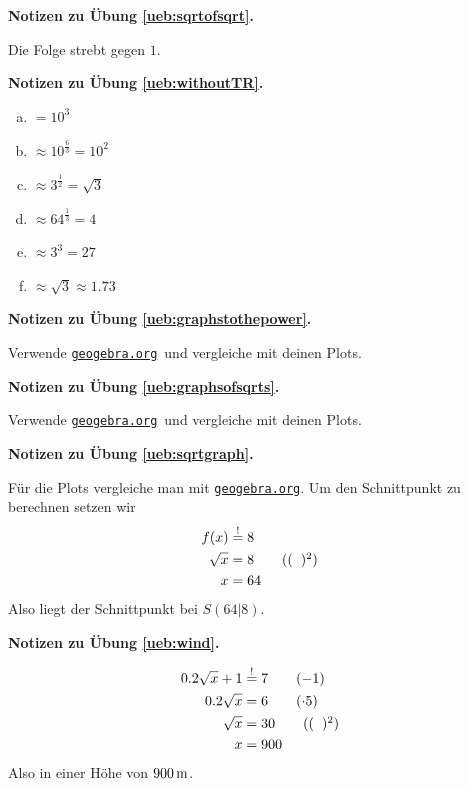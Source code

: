 \documentclass[%
11pt,%
twoside,%
titlepage,%
german,%
headsepline%
]{scrartcl}
\newcommand{\geogebralink}{\href{https://www.geogebra.org/calculator}{\texttt{geogebra.org}}}
\newcommand{\concatueb}[1]{ueb:#1}%
\newcommand{\concatlsg}[1]{lsg:#1}%
\newenvironment{lsg}[1]{%
    \par\noindent\textbf{Notizen zu Übung \ref{\concatueb{#1}}.}%
    \label{\concatlsg{#1}}
}{%
    \par%
}
\begin{document}

\begin{lsg}{sqrtofsqrt}
  Die Folge strebt gegen $1$.
\end{lsg}

\begin{lsg}{withoutTR}
  \begin{enumerate}[a)]
    \item $=10^3$
    \item $\approx10^\frac{6}{3}=10^2$
    \item $\approx3^\frac{1}{2}=\sqrt{3}$
    \item $\approx64^\frac{1}{3}=4$
    \item $\approx3^3=27$
    \item $\approx\sqrt{3}\approx1.73$
  \end{enumerate}
\end{lsg}

\begin{lsg}{graphstothepower}
  Verwende \geogebralink\   und vergleiche mit deinen Plots.
\end{lsg}

\begin{lsg}{graphsofsqrts}
  Verwende \geogebralink\   und vergleiche mit deinen Plots.
\end{lsg}

\begin{lsg}{sqrtgraph}
  Für die Plots vergleiche man mit \geogebralink . Um den Schnittpunkt zu berechnen setzen wir
  \begin{align*}
    f(x) &\stackrel{!}{=} 8\\
    \sqrt{x} &= 8\tag{$(\phantom{x})^2$}\\
    x &= 64
  \end{align*}
  Also liegt der Schnittpunkt bei $S(64|8)$.
\end{lsg}

\begin{lsg}{wind}
  \begin{align*}
    0.2\sqrt{x}+1 &\stackrel{!}{=} 7\tag{$-1$}\\
    0.2\sqrt{x} &= 6\tag{$\cdot5$}\\
    \sqrt{x} &= 30\tag{$(\phantom{x})^2$}\\
    x &= 900
  \end{align*}
  Also in einer Höhe von $\unit[900]{m}$.
\end{lsg}
\end{document}
